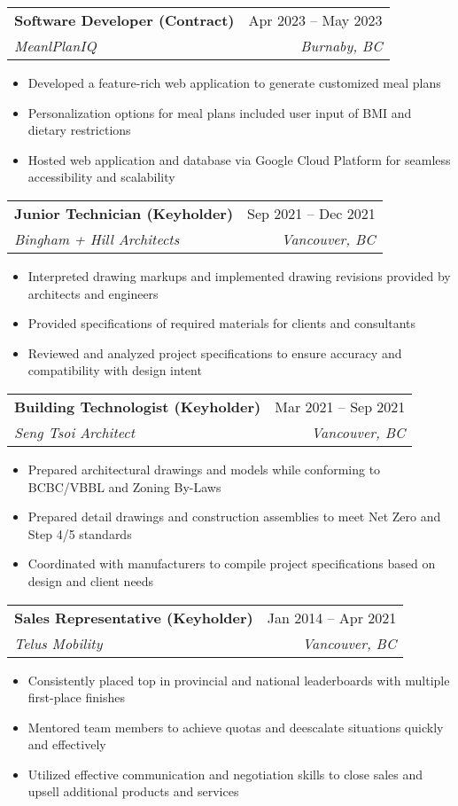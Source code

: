 \documentclass[letterpaper,11pt]{article}
\makeatletter
\newcommand{\resumeItem}[1]{
  \item\small{
    {#1 \vspace{-2pt}}
  }
}
\newcommand{\resumeSubheading}[4]{
  \vspace{-2pt}\item
    \begin{tabular*}{0.97\textwidth}[t]{l@{\extracolsep{\fill}}r}
      \textbf{#1} & #2 \\
      \textit{\small#3} & \textit{\small #4} \\
    \end{tabular*}\vspace{-7pt}
}
\newcommand{\resumeSubSubheading}[2]{
    \item
    \begin{tabular*}{0.97\textwidth}{l@{\extracolsep{\fill}}r}
      \textit{\small#1} & \textit{\small #2} \\
    \end{tabular*}\vspace{-7pt}
}
\newcommand{\resumeSubHeadingListEnd}{\end{itemize}}
\newcommand{\resumeItemListStart}{\begin{itemize}}
\newcommand{\resumeItemListEnd}{\end{itemize}\vspace{-5pt}}
\makeatother
\begin{document}
	\resumeSubheading
	  {Software Developer (Contract)}{Apr 2023 -- May 2023}
	  {MeanlPlanIQ}{Burnaby, BC}
	  \resumeItemListStart
	    \resumeItem{Developed a feature-rich web application to generate customized meal plans}
		\resumeItem{Personalization options for meal plans included user input of BMI and dietary restrictions}
		\resumeItem{Hosted web application and database via Google Cloud Platform for seamless accessibility and scalability}
	\resumeItemListEnd

    \resumeSubheading
	  {Junior Technician (Keyholder)}{Sep 2021 -- Dec 2021}
	  {Bingham + Hill Architects}{Vancouver, BC}
      \resumeItemListStart
        \resumeItem{Interpreted drawing markups and implemented drawing revisions provided by architects and engineers}
        \resumeItem{Provided specifications of required materials for clients and consultants}
        \resumeItem{Reviewed and analyzed project specifications to ensure accuracy and compatibility with design intent}
	\resumeItemListEnd
      

    \resumeSubheading
	  {Building Technologist (Keyholder)}{Mar 2021 -- Sep 2021}
	  {Seng Tsoi Architect}{Vancouver, BC}
      \resumeItemListStart
        \resumeItem{Prepared architectural drawings and models while conforming to BCBC/VBBL and Zoning By-Laws}
        \resumeItem{Prepared detail drawings and construction assemblies to meet Net Zero and Step 4/5 standards}
        \resumeItem{Coordinated with manufacturers to compile project specifications based on design and client needs}
    \resumeItemListEnd

    \resumeSubheading
	  {Sales Representative (Keyholder)}{Jan 2014 -- Apr 2021}
	  {Telus Mobility}{Vancouver, BC}
      \resumeItemListStart
	    \resumeItem{Consistently placed top in provincial and national leaderboards with multiple first-place finishes}
        \resumeItem{Mentored team members to achieve quotas and deescalate situations quickly and effectively}
		\resumeItem{Utilized effective communication and negotiation skills to close sales and upsell additional products and services}
	\resumeItemListEnd
\end{document}
